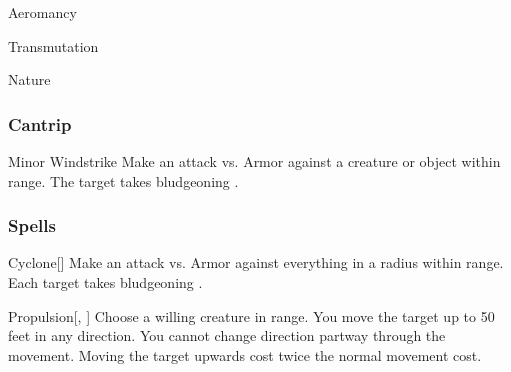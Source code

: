 
\begin{spellsection}{Aeromancy}

\begin{spellheader}
\end{spellheader}


 Transmutation

 Nature

\subsubsection{Cantrip}


\begin{freeability}{Minor Windstrike}
Make an attack vs. Armor against a creature or object within \rngmed range.
\hit The target takes bludgeoning .
\end{freeability}

\end{spellsection}


\subsubsection{Spells}


\lowercase{\hypertarget{spell:Cyclone}{}}\label{spell:Cyclone}
\begin{apability}[\nth{1}]{\hypertarget{spell:Cyclone}{Cyclone}}[]
Make an attack vs. Armor against everything in a \areasmall radius within \rngmed range.
\hit Each target takes bludgeoning .
\end{apability}
\vspace{0.25em}



\lowercase{\hypertarget{spell:Propulsion}{}}\label{spell:Propulsion}
\begin{apability}[\nth{1}]{\hypertarget{spell:Propulsion}{Propulsion}}[, ]
Choose a willing creature in \rngclose range.
You move the target up to 50 feet in any direction.
You cannot change direction partway through the movement.
Moving the target upwards cost twice the normal movement cost.
\end{apability}
\vspace{0.25em}



